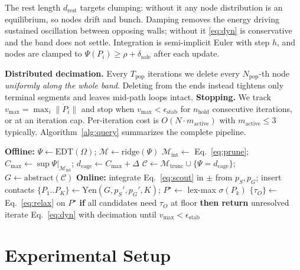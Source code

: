 \documentclass[conference]{IEEEtran}
\begin{document}
The rest length $d_{\mathrm{rest}}$ targets clumping: without it any node distribution is an equilibrium, so nodes drift and bunch. Damping removes the energy driving sustained oscillation between opposing walls; without it \eqref{eq:dyn} is conservative and the band does not settle. Integration is semi-implicit Euler with step $h$, and nodes are clamped to $\Psi(P_i)\ge\rho+\delta_{\mathrm{safe}}$ after each update.

\textbf{Distributed decimation.} Every $T_{\mathrm{pop}}$ iterations we delete every $N_{\mathrm{pop}}$-th node \emph{uniformly along the whole band}. Deleting from the ends instead tightens only terminal segments and leaves mid-path loops intact. \textbf{Stopping.} We track $v_{\max}=\max_i\|\dot{P}_i\|$ and stop when $v_{\max}<\epsilon_{\mathrm{stab}}$ for $n_{\mathrm{hold}}$ consecutive iterations, or at an iteration cap. Per-iteration cost is $O(N\cdot m_{\mathrm{active}})$ with $m_{\mathrm{active}}\le 3$ typically. Algorithm~\ref{alg:query} summarizes the complete pipeline.

\begin{algorithm}[htbp]
\caption{Topological Cage query}
\label{alg:query}
\begin{algorithmic}[1]
\STATE \textbf{Offline:} $\Psi\!\leftarrow\!\mathrm{EDT}(\Omega)$; $\mathcal{M}\!\leftarrow\!\mathrm{ridge}(\Psi)$
\STATE $\mathcal{M}_{\mathrm{int}}\!\leftarrow\!$ Eq.~\eqref{eq:prune}; $C_{\max}\!\leftarrow\!\sup\Psi|_{\mathcal{M}_{\mathrm{int}}}$; $d_{\mathrm{cage}}\!\leftarrow\!C_{\max}\!+\!\Delta$
\STATE $\mathcal{C}\!\leftarrow\!\mathcal{M}_{\mathrm{trunc}}\cup\{\Psi\!=\!d_{\mathrm{cage}}\}$; $G\!\leftarrow\!\mathrm{abstract}(\mathcal{C})$
\STATE \textbf{Online:} integrate Eq.~\eqref{eq:scout} in $\pm$ from $p_S,p_G$; insert contacts
\STATE $\{P_1..P_K\}\leftarrow\mathrm{Yen}(G,p_S',p_G',K)$; $P^\star\leftarrow$ lex-max $\sigma(P_k)$
\STATE $\{\tau_O\}\leftarrow$ Eq.~\eqref{eq:relax} on $P^\star$
\STATE \textbf{if} all candidates need $\tau_O$ at floor \textbf{then return} unresolved
\STATE iterate Eq.~\eqref{eq:dyn} with decimation until $v_{\max}<\epsilon_{\mathrm{stab}}$
\end{algorithmic}
\end{algorithm}

\section{Experimental Setup}
\label{sec:setup}
\end{document}
